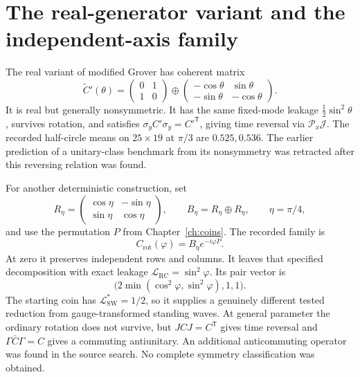 \documentclass[11pt,a4paper,oneside]{report}
\newcommand{\sw}{\mathrm{SW}}
\newcommand{\rc}{\mathrm{RC}}
\numberwithin{equation}{chapter}
\begin{document}
\section{The real-generator variant and the independent-axis family}

The real variant of modified Grover has coherent matrix
\begin{equation}
\widetilde C'(\theta)=
\begin{pmatrix}0&1\\1&0\end{pmatrix}
\oplus
\begin{pmatrix}-\cos\theta&\sin\theta\\
-\sin\theta&-\cos\theta\end{pmatrix}.
\end{equation}
It is real but generally nonsymmetric. It has the same fixed-mode
leakage \(\frac12\sin^2\theta\), survives rotation, and satisfies
\(\sigma_yC'\sigma_y=C'^{\mathsf T}\), giving time reversal via
\(\mathcal P_x\mathcal J\). The recorded half-circle means on
\(25\times19\) at \(\pi/3\) are \(0.525,0.536\). The earlier
prediction of a unitary-class benchmark from its nonsymmetry was
retracted after this reversing relation was found.

For another deterministic construction, set
\begin{equation}
R_\eta=\begin{pmatrix}\cos\eta&-\sin\eta\\
\sin\eta&\cos\eta\end{pmatrix},\qquad
B_\eta=R_\eta\oplus R_\eta,\qquad\eta=\pi/4,
\end{equation}
and use the permutation \(P\) from Chapter~\ref{ch:coins}. The
recorded family is
\begin{equation}
C_{\mathrm{rot}}(\varphi)
=B_\eta e^{-i\varphi P}.
\end{equation}
At zero it preserves independent rows and columns. It leaves that
specified decomposition with exact leakage
\(\mathcal L_{\rc}=\sin^2\varphi\). Its pair vector is
\begin{equation}
\bigl(2\min(\cos^2\varphi,\sin^2\varphi),1,1\bigr).
\end{equation}
The starting coin has \(\mathcal L^*_{\sw}=1/2\), so it supplies
a genuinely different tested reduction from gauge-transformed
standing waves. At general parameter the ordinary rotation does not
survive, but \(JCJ=C^{\mathsf T}\) gives time reversal and
\(\Gamma\bar C\Gamma=C\) gives a commuting antiunitary.
An additional anticommuting operator was found in the source search.
No complete symmetry classification was obtained.
\end{document}
